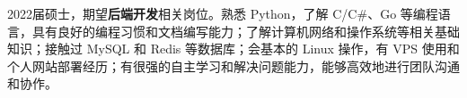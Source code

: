 {\onehalfspacing\hspace{2em}%
2022届硕士，期望\textbf{后端开发}相关岗位。熟悉 Python，了解 C/C\#、Go 等编程语言，具有良好的编程习惯和文档编写能力；了解计算机网络和操作系统等相关基础知识；接触过 MySQL 和 Redis 等数据库；会基本的 Linux 操作，有 VPS 使用和个人网站部署经历；有很强的自主学习和解决问题能力，能够高效地进行团队沟通和协作。
\par}